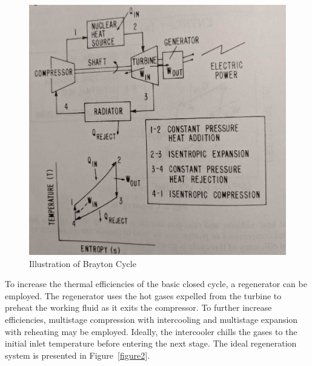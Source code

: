 \documentclass{article}
\begin{document}
\begin{figure}[]
	\centering
	\includegraphics[height=0.45\textheight]{fig/figure1}
	\caption[Illustration of Brayton Cycle]{Illustration of Brayton Cycle~\cite{buden2011spacebook1}}
	\label{figure1}
\end{figure}


To increase the thermal efficiencies of the basic closed cycle, a regenerator can be employed. The regenerator uses the hot gases expelled from the turbine to preheat the working fluid as it exits the compressor. To further increase efficiencies, multistage compression with intercooling and multistage expansion with reheating may be employed. Ideally, the intercooler chills the gases to the initial inlet temperature before entering the next stage. The ideal regeneration system is presented in Figure~\ref{figure2}. 
\end{document}
